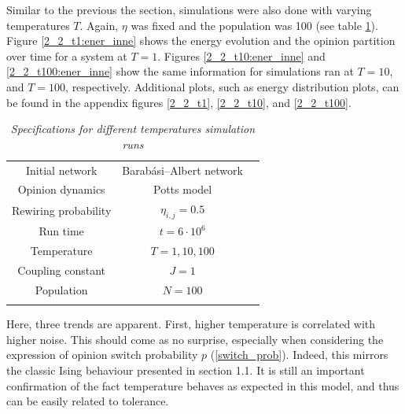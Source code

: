 \documentclass[12pt,openright,twoside]{book}
\begin{document}
Similar to the previous the section, simulations were also done with varying temperatures $T$. Again, $\eta$ was fixed and the population was 100 (see table \ref{T-specs}).\\

Figure \ref{2_2_t1:ener_inne} shows the energy evolution and the opinion partition over time for a system at $T=1$. Figures \ref{2_2_t10:ener_inne} and \ref{2_2_t100:ener_inne} show the same information for simulations ran at $T=10$, and $T=100$, respectively. Additional plots, such as energy distribution plots, can be found in the appendix figures \ref{2_2_t1}, \ref{2_2_t10}, and \ref{2_2_t100}.\\

\begin{table}[!ht]
\centering
\begin{small}
\caption{\textit{Specifications for different temperatures simulation runs}}
\begin{tabular}{ccc}
\hline
Initial network             & Barabási–Albert network\\
Opinion dynamics            & Potts model \\
Rewiring probability        & $\eta_{i,j}=0.5$\\
Run time                    & $t=6\cdot 10^6$\\
Temperature                 & $T=1,10,100$ \\
Coupling constant           & $J=1$ \\
Population                  & $N=100$ \\
\hline
\label{T-specs}
\end{tabular}
\end{small}
\end{table}

Here, three trends are apparent. First, higher temperature is correlated with higher noise. This should come as no surprise, especially when considering the expression of opinion switch probability $p$ (\ref{switch_prob}). Indeed, this mirrors the classic Ising behaviour presented in section 1.1. It is still an important confirmation of the fact temperature behaves as expected in this model, and thus can be easily related to tolerance.\\
\end{document}
